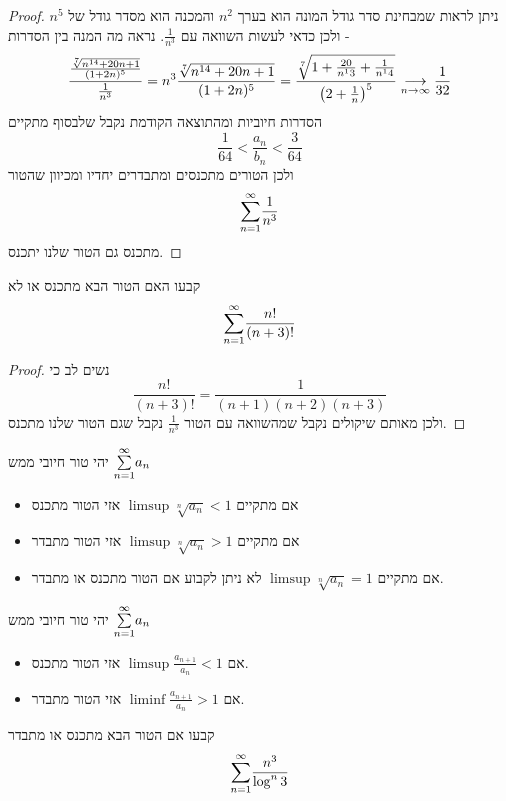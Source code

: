 \documentclass{article}
\begin{document}
\begin{proof}
ניתן לראות שמבחינת סדר גודל המונה הוא בערך 
$n^2$
והמכנה הוא מסדר גודל של 
$n^5$
ולכן כדאי לעשות השוואה עם 
$\frac{1}{n^3}$.
נראה מה המנה בין הסדרות - 
\[\frac{\frac{\sqrt[7]{n^{14}+20n+1}}{(1+2n)^5}}{\frac{1}{n^3}} = n^3\frac{\sqrt[7]{n^{14}+20n+1}}{(1+2n)^5} = \frac{\sqrt[7]{1+\frac{20}{n^13}+\frac{1}{n^14}}}{\left(2+\frac{1}{n}\right)^5}\underset{n\rightarrow\infty}{\longrightarrow} \frac{1}{32}\]
הסדרות חיוביות ומהתוצאה הקודמת נקבל שלבסוף מתקיים 
\[\frac{1}{64}<\frac{a_n}{b_n}<\frac{3}{64}\]
ולכן הטורים מתכנסים ומתבדרים יחדיו ומכיוון שהטור 
\[\overset{\infty}{\underset{n=1}{\sum}}\frac{1}{n^3}\]
מתכנס גם הטור שלנו יתכנס.
\end{proof}

\begin{exercise}
קבעו האם הטור הבא מתכנס או לא
\[\overset{\infty}{\underset{n=1}{\sum}}\frac{n!}{(n+3)!}\]
\end{exercise}

\begin{proof}
נשים לב כי 
\[\frac{n!}{(n+3)!}=\frac{1}{(n+1)(n+2)(n+3)}\]
ולכן מאותם שיקולים נקבל שמהשוואה עם הטור 
$\frac{1}{n^3}$
נקבל שגם הטור שלנו מתכנס.
\end{proof}

\begin{theorem}
יהי טור חיובי ממש 
$\overset{\infty}{\underset{n=1}{\sum}} a_n$
\begin{itemize}
\item אם מתקיים 
 $\limsup \sqrt[n]{a_n}<1$
 אזי הטור מתכנס
 
\item אם מתקיים 
 $\limsup \sqrt[n]{a_n}>1$
 אזי הטור מתבדר
\item אם מתקיים 
 $\limsup \sqrt[n]{a_n}=1$
 לא ניתן לקבוע אם הטור מתכנס או מתבדר.
\end{itemize}
\end{theorem}

\begin{theorem}
יהי טור חיובי ממש 
$\overset{\infty}{\underset{n=1}{\sum}} a_n$
\begin{itemize}
\item אם 
$\limsup\frac{a_{n+1}}{a_n}<1$
אזי הטור מתכנס.
\item אם 
$\liminf\frac{a_{n+1}}{a_n}>1$
אזי הטור מתבדר.
\end{itemize}
\end{theorem}

\begin{exercise}
קבעו אם הטור הבא מתכנס או מתבדר 
\[\overset{\infty}{\underset{n=1}{\sum}} \frac{n^3}{\log^n 3}\]
\end{exercise}
\end{document}
